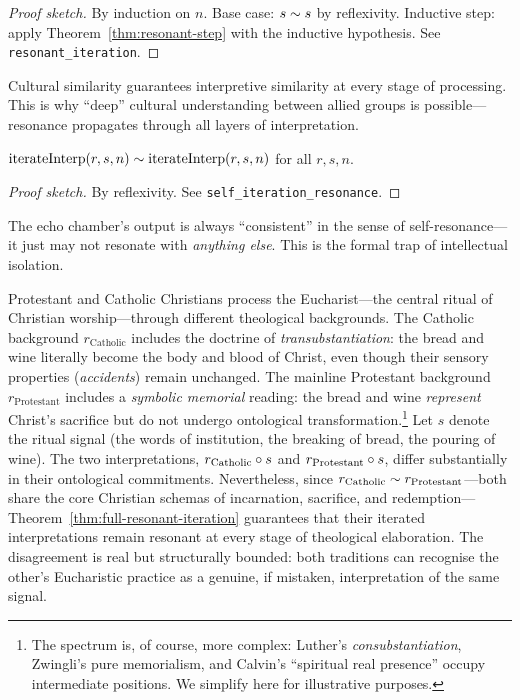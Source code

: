 \begin{proof}[Proof sketch]
By induction on $n$.  Base case: $s \sim s$ by reflexivity.  Inductive
step: apply Theorem~\ref{thm:resonant-step} with the inductive
hypothesis.
See \texttt{resonant\_iteration}.
\end{proof}

\begin{remark}
Cultural similarity guarantees interpretive similarity at every stage
of processing.  This is why ``deep'' cultural understanding between
allied groups is possible---resonance propagates through all layers of
interpretation.
\end{remark}

\begin{theorem}
\label{thm:self-iter-resonance}
$\operatorname{iterateInterp}(r, s, n) \sim
 \operatorname{iterateInterp}(r, s, n)$ for all $r, s, n$.
\end{theorem}

\begin{proof}[Proof sketch]
By reflexivity.  See \texttt{self\_iteration\_resonance}.
\end{proof}

\begin{remark}
The echo chamber's output is always ``consistent'' in the sense of
self-resonance---it just may not resonate with \emph{anything else}.
This is the formal trap of intellectual isolation.
\end{remark}

\begin{example}
Protestant and Catholic Christians process the Eucharist---the central
ritual of Christian worship---through different theological backgrounds.
The Catholic background $r_{\mathrm{Catholic}}$ includes the doctrine of
\emph{transubstantiation}: the bread and wine literally become the body
and blood of Christ, even though their sensory properties
(\emph{accidents}) remain unchanged.  The mainline Protestant background
$r_{\mathrm{Protestant}}$ includes a \emph{symbolic memorial} reading:
the bread and wine \emph{represent} Christ's sacrifice but do not
undergo ontological transformation.\footnote{The spectrum is, of course,
more complex: Luther's \emph{consubstantiation}, Zwingli's pure
memorialism, and Calvin's ``spiritual real presence'' occupy intermediate
positions.  We simplify here for illustrative purposes.}  Let $s$ denote
the ritual signal (the words of institution, the breaking of bread, the
pouring of wine).  The two interpretations,
$r_{\mathrm{Catholic}} \circ s$ and
$r_{\mathrm{Protestant}} \circ s$, differ substantially in their
ontological commitments.  Nevertheless, since
$r_{\mathrm{Catholic}} \sim r_{\mathrm{Protestant}}$---both share the
core Christian schemas of incarnation, sacrifice, and redemption---Theorem~\ref{thm:full-resonant-iteration} guarantees that their
iterated interpretations remain resonant at every stage of theological
elaboration.  The disagreement is real but structurally bounded: both
traditions can recognise the other's Eucharistic practice as a genuine,
if mistaken, interpretation of the same signal.
\end{example}

